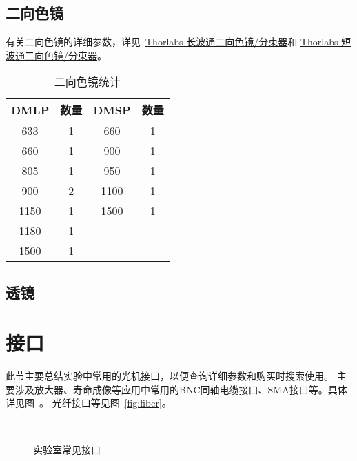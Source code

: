\documentclass[cn,11pt,chinese]{elegantbook}
\begin{document}
\subsection{二向色镜}
有关二向色镜的详细参数，详见~\href{https://www.thorlabschina.cn/newgrouppage9.cfm?objectgroup_id=3313}{Thorlabs 长波通二向色镜/分束器}和
\href{https://www.thorlabschina.cn/newgrouppage9.cfm?objectgroup_id=9240}{Thorlabs 短波通二向色镜/分束器}。

\begin{table}[htbp]
  \centering
  \caption{二向色镜统计}
    \begin{tabular}{cc|cc}
      \toprule
    DMLP  & 数量    & DMSP  & 数量 \\
    \midrule
    633   & 1     & 660   & 1 \\
    660   & 1     & 900   & 1 \\
    805   & 1     & 950   & 1 \\
    900   & 2     & 1100  & 1 \\
    1150  & 1     & 1500  & 1 \\
    1180  & 1     &       &  \\
    1500  & 1     &       &  \\
    
    \bottomrule
    \end{tabular}%
  \label{tab:DM}%
\end{table}%

\subsection{透镜}

\section{接口}
此节主要总结实验中常用的光机接口，以便查询详细参数和购买时搜索使用。
主要涉及放大器、寿命成像等应用中常用的BNC同轴电缆接口、SMA接口等。具体详见图~。
光纤接口等见图~\vref{fig:fiber}。
\begin{figure}[h]
	\centering
	 \quad
	 \quad
	 \quad
	 \\
	\caption{实验室常见接口} 
	\label{fig:pin}
\end{figure}
\end{document}

